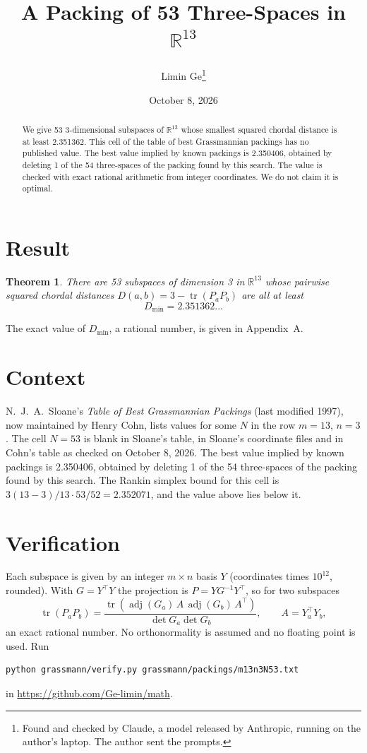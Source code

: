 \documentclass[11pt,a4paper]{article}
\title{A Packing of 53 Three-Spaces in $\mathbb{R}^{13}$}
\author{Limin Ge\thanks{Found and checked by Claude, a model released by Anthropic, running on the author's laptop. The author sent the prompts.}}
\date{October 8, 2026}
\newtheorem*{theorem}{Theorem}
\begin{document}
\maketitle
\begin{abstract}
We give 53 3-dimensional subspaces of $\mathbb{R}^{13}$ whose smallest squared chordal distance is at least 2.351362. This cell of the table of best Grassmannian packings has no published value. The best value implied by known packings is 2.350406, obtained by deleting 1 of the 54 three-spaces of the packing found by this search. The value is checked with exact rational arithmetic from integer coordinates. We do not claim it is optimal.
\end{abstract}

\section{Result}
\begin{theorem}
There are 53 subspaces of dimension 3 in $\mathbb{R}^{13}$ whose pairwise squared chordal distances $D(a,b) = 3 - \operatorname{tr}(P_aP_b)$ are all at least
\[ D_{\min} = 2.351362\ldots \]
\end{theorem}
The exact value of $D_{\min}$, a rational number, is given in Appendix~A.


\section{Context}
N.~J.~A.~Sloane's \emph{Table of Best Grassmannian Packings} (last modified 1997), now maintained by Henry Cohn, lists values for some $N$ in the row $m=13$, $n=3$. The cell $N=53$ is blank in Sloane's table, in Sloane's coordinate files and in Cohn's table as checked on October 8, 2026. The best value implied by known packings is 2.350406, obtained by deleting 1 of the 54 three-spaces of the packing found by this search. The Rankin simplex bound for this cell is $3(13-3)/13\cdot 53/52 = 2.352071$, and the value above lies below it.


\section{Verification}
Each subspace is given by an integer $m\times n$ basis $Y$ (coordinates times $10^{12}$, rounded). With $G=Y^\top Y$ the projection is $P=YG^{-1}Y^\top$, so for two subspaces
\[ \operatorname{tr}(P_aP_b)=\frac{\operatorname{tr}(\operatorname{adj}(G_a)\,A\,\operatorname{adj}(G_b)\,A^\top)}{\det G_a\det G_b},\qquad A=Y_a^\top Y_b, \]
an exact rational number. No orthonormality is assumed and no floating point is used. Run
\begin{verbatim}
python grassmann/verify.py grassmann/packings/m13n3N53.txt
\end{verbatim}
in \url{https://github.com/Ge-limin/math}.
\end{document}
